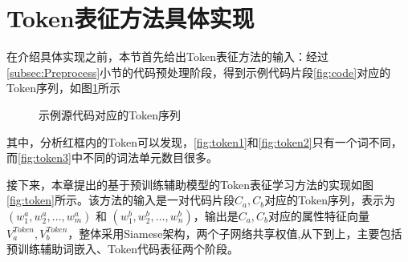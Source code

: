 \section{Token表征方法具体实现}
\label{sec:Tokenachieve}
在介绍具体实现之前，本节首先给出Token表征方法的输入：经过\ref{subsec:Preprocess}小节的代码预处理阶段，得到示例代码片段\ref{fig:code}对应的Token序列，如图\ref{fig:tokencode}所示
\begin{figure}[H] 
  \centering  %
  \caption{示例源代码对应的Token序列}    %
  \label{fig:tokencode}    %
\end{figure}

其中，分析红框内的Token可以发现，\ref{fig:token1}和\ref{fig:token2}只有一个词不同，而\ref{fig:token3}中不同的词法单元数目很多。

接下来，本章提出的基于预训练辅助模型的Token表征学习方法的实现如图\ref{fig:token}所示。该方法的输入是一对代码片段$C_{a},C_{b}$对应的Token序列，表示为$\left( w_{1}^{a},w_{2}^{a},\ldots,w_{m}^{a}\right)$ 和 $\left( w_{1}^{b},w_{2}^{b},\ldots,w_{n}^{b} \right)$，输出是$C_{a},C_{b}$对应的属性特征向量 $V_{a}^{Token},V_{b}^{Token}$，整体采用Siamese架构，两个子网络共享权值,从下到上，主要包括预训练辅助词嵌入、Token代码表征两个阶段。

